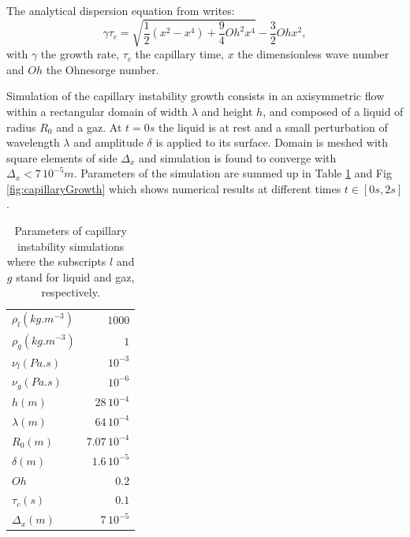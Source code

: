 \documentclass[twocolumn,10pt]{asme2ej}
\begin{document}
The analytical dispersion equation from \cite{chandrasekhar2013hydrodynamic} writes:
\begin{equation}
    \gamma \tau_c = \sqrt{\frac{1}{2}(x^{2}-x^{4}) + \frac{9}{4}Oh^{2}x^{4}}-\frac{3}{2}Oh x^{2},
    \label{eq:growthRateAnalytical}
\end{equation}
with $\gamma$ the growth rate, $\displaystyle \tau_c $ the capillary time, $x$ the dimensionless wave number and $Oh$ the Ohnesorge number.


Simulation of the capillary instability growth consists in an axisymmetric flow within a rectangular domain of width $\lambda$ and height $h$, and composed of a liquid of radius $R_0$ and a gaz. At $t = 0s$ the liquid is at rest and a small perturbation of wavelength $\lambda$ and amplitude $\delta$ is applied to its surface. 
Domain is meshed with square elements of side $\Delta_x$ and simulation is found to converge with $\Delta_x< 7\,10^{-5}m$. Parameters of the simulation are summed up in Table \ref{tab:parametersPinch} and Fig \ref{fig:capillaryGrowth} which shows numerical results at different times $t \in [0s,2s]$.

\begin{table}
    \begin{center}
        \begin{tabular}{lr}
            \hline
            $\rho_{l} (kg.m^{-3})$ & $1000$\\
            $\rho_{g} (kg.m^{-3})$ & $1$\\
            $\nu_{l} (Pa.s)$ & $10^{-3}$\\
            $\nu_{g} (Pa.s)$ & $10^{-6}$\\
            $h(m)$ & $28\, 10^{-4}$\\
            $\lambda (m)$ & $64\, 10^{-4}$\\
            $R_0(m)$ & $7.07\, 10^{-4}$\\
            $\delta (m)$ & $1.6\, 10^{-5}$\\
            $Oh$ & $0.2$\\
            $\tau_{c}(s)$ & $0.1$  \\   
            $\Delta_x(m)$ & $7\,10^{-5}$ \\      
            \hline
        \end{tabular}
    \end{center}
    
    \caption{\label{tab:parametersPinch}Parameters of capillary instability simulations where the subscripts $l$ and $g$ stand for liquid and gaz, respectively.}
\end{table}
\end{document}
